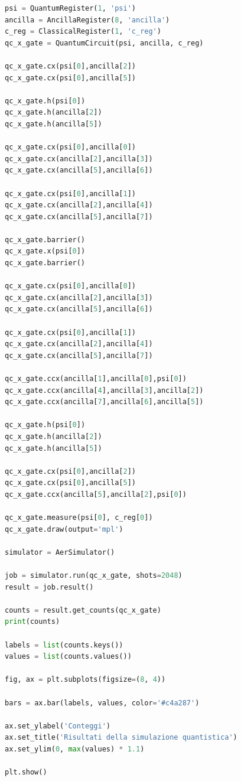 \documentclass[12pt, a4paper]{article}
\begin{document}
\begin{lstlisting}[language={Python}]
psi = QuantumRegister(1, 'psi')
ancilla = AncillaRegister(8, 'ancilla')
c_reg = ClassicalRegister(1, 'c_reg')
qc_x_gate = QuantumCircuit(psi, ancilla, c_reg)

qc_x_gate.cx(psi[0],ancilla[2])
qc_x_gate.cx(psi[0],ancilla[5])

qc_x_gate.h(psi[0])
qc_x_gate.h(ancilla[2])
qc_x_gate.h(ancilla[5])

qc_x_gate.cx(psi[0],ancilla[0])
qc_x_gate.cx(ancilla[2],ancilla[3])
qc_x_gate.cx(ancilla[5],ancilla[6])

qc_x_gate.cx(psi[0],ancilla[1])
qc_x_gate.cx(ancilla[2],ancilla[4])
qc_x_gate.cx(ancilla[5],ancilla[7])

qc_x_gate.barrier()
qc_x_gate.x(psi[0])
qc_x_gate.barrier()

qc_x_gate.cx(psi[0],ancilla[0])
qc_x_gate.cx(ancilla[2],ancilla[3])
qc_x_gate.cx(ancilla[5],ancilla[6])

qc_x_gate.cx(psi[0],ancilla[1])
qc_x_gate.cx(ancilla[2],ancilla[4])
qc_x_gate.cx(ancilla[5],ancilla[7])

qc_x_gate.ccx(ancilla[1],ancilla[0],psi[0])
qc_x_gate.ccx(ancilla[4],ancilla[3],ancilla[2])
qc_x_gate.ccx(ancilla[7],ancilla[6],ancilla[5])

qc_x_gate.h(psi[0])
qc_x_gate.h(ancilla[2])
qc_x_gate.h(ancilla[5])

qc_x_gate.cx(psi[0],ancilla[2])
qc_x_gate.cx(psi[0],ancilla[5])
qc_x_gate.ccx(ancilla[5],ancilla[2],psi[0])

qc_x_gate.measure(psi[0], c_reg[0])
qc_x_gate.draw(output='mpl')

simulator = AerSimulator()

job = simulator.run(qc_x_gate, shots=2048)
result = job.result()

counts = result.get_counts(qc_x_gate)
print(counts)

labels = list(counts.keys())
values = list(counts.values())

fig, ax = plt.subplots(figsize=(8, 4))

bars = ax.bar(labels, values, color='#c4a287')

ax.set_ylabel('Conteggi')
ax.set_title('Risultati della simulazione quantistica')
ax.set_ylim(0, max(values) * 1.1)

plt.show()
\end{lstlisting}
\end{document}
